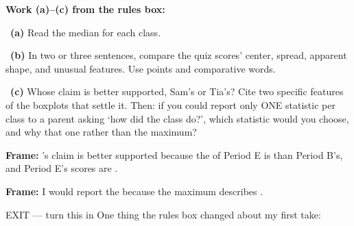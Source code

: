 \documentclass[11pt]{article}
\begin{document}
\newpage
\textbf{Work (a)--(c) from the rules box:}\par\smallskip

~\textbf{(a)} Read the median for each class.\par
\workspace{0.6in}

~\textbf{(b)} In two or three sentences, compare the quiz scores' center, spread, apparent shape, and unusual features. Use points and comparative words.\par
\workspace{1.5in}

~\textbf{(c)} Whose claim is better supported, Sam's or Tia's? Cite two specific features of the boxplots that settle it. Then: if you could report only ONE statistic per class to a parent asking `how did the class do?', which statistic would you choose, and why that one rather than the maximum?\par
\workspace{2.0in}

\begin{sentenceframebox}\raggedright\textbf{Frame:} \blank[0.8in]'s claim is better supported because the \blank[1in] of Period E is \blank[0.8in] than Period B's, and Period E's scores are \blank[1in].\end{sentenceframebox}

\begin{sentenceframebox}\raggedright\textbf{Frame:} I would report the \blank[0.9in] because the maximum describes \blank[1.6in].\end{sentenceframebox}

\begin{summaryexitbox}{EXIT --- turn this in}
One thing the rules box changed about my first take: \hrulefill\par
\workspace{0.4in}
\end{summaryexitbox}

\end{document}
